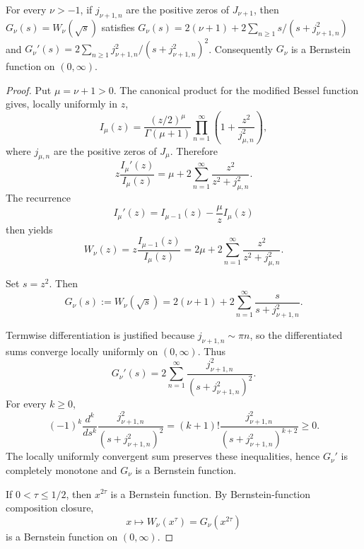 \begin{theorem}
\label{res:yt-bessel-w-general-zero-partial-fraction}
For every \(\nu>-1\), if \(j_{\nu+1,n}\) are the positive zeros of \(J_{\nu+1}\), then \(G_\nu(s)=W_\nu(\sqrt{s})\) satisfies \(G_\nu(s)=2(\nu+1)+2\sum_{n\ge1}s/(s+j_{\nu+1,n}^2)\) and \(G_\nu'(s)=2\sum_{n\ge1}j_{\nu+1,n}^2/(s+j_{\nu+1,n}^2)^2\). Consequently \(G_\nu\) is a Bernstein function on \((0,\infty)\).
\end{theorem}
\begin{proof}
Put \(\mu=\nu+1>0\). The canonical product for the modified Bessel function gives, locally uniformly in \(z\),
\[
I_\mu(z)=\frac{(z/2)^\mu}{\Gamma(\mu+1)}
\prod_{n=1}^{\infty}\left(1+\frac{z^2}{j_{\mu,n}^2}\right),
\]
where \(j_{\mu,n}\) are the positive zeros of \(J_\mu\). Therefore
\[
z\frac{I_\mu'(z)}{I_\mu(z)}
=\mu+2\sum_{n=1}^{\infty}\frac{z^2}{z^2+j_{\mu,n}^2}.
\]
The recurrence
\[
I_\mu'(z)=I_{\mu-1}(z)-\frac{\mu}{z}I_\mu(z)
\]
then yields
\[
W_\nu(z)
=z\frac{I_{\mu-1}(z)}{I_\mu(z)}
=2\mu+2\sum_{n=1}^{\infty}\frac{z^2}{z^2+j_{\mu,n}^2}.
\]

Set \(s=z^2\). Then
\[
G_\nu(s):=W_\nu(\sqrt s)
=2(\nu+1)+2\sum_{n=1}^{\infty}\frac{s}{s+j_{\nu+1,n}^2}.
\]

Termwise differentiation is justified because \(j_{\nu+1,n}\sim \pi n\), so the differentiated sums converge locally uniformly on \((0,\infty)\). Thus
\[
G_\nu'(s)
=2\sum_{n=1}^{\infty}
\frac{j_{\nu+1,n}^2}{(s+j_{\nu+1,n}^2)^2}.
\]
For every \(k\ge0\),
\[
(-1)^k\frac{d^k}{ds^k}
\frac{j_{\nu+1,n}^2}{(s+j_{\nu+1,n}^2)^2}
=
(k+1)!\frac{j_{\nu+1,n}^2}{(s+j_{\nu+1,n}^2)^{k+2}}
\ge0.
\]
The locally uniformly convergent sum preserves these inequalities, hence \(G_\nu'\) is completely monotone and \(G_\nu\) is a Bernstein function.

If \(0<\tau\le1/2\), then \(x^{2\tau}\) is a Bernstein function. By Bernstein-function composition closure,
\[
x\mapsto W_\nu(x^\tau)=G_\nu(x^{2\tau})
\]
is a Bernstein function on \((0,\infty)\).
\end{proof}

